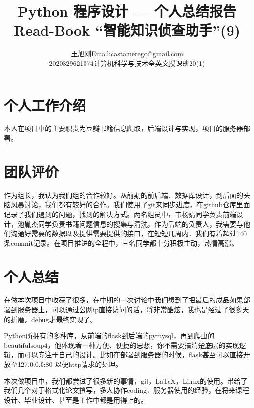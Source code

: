 \documentclass[twoside,11pt]{article}
\makeatletter
\newcommand\studentName{王旭刚}
\newcommand\studentEmail{Email:castamerego@gmail.com}
\newcommand\studentNumber{2020329621074}
\newcommand\studentClass{计算机科学与技术全英文授课班20(1)}
\makeatother
\begin{document}
\title{\Huge Python 程序设计 --- 个人总结报告 \\ \huge Read-Book ``智能知识侦查助手''(9) }

\author{\name \studentName \email \studentEmail \\
    \studentNumber \class  \studentClass
}

\maketitle

\section{个人工作介绍}
本人在项目中的主要职责为豆瓣书籍信息爬取，后端设计与实现，项目的服务器部署。

\section{团队评价}
作为组长，我认为我们组的合作较好。从前期的前后端、数据库设计，到后面的头脑风暴讨论，我们都有较好的合作。我们使用了git来同步进度，在github仓库里面记录了我们遇到的问题，找到的解决方式。两名组员中，韦杨婧同学负责前端设计，池胤杰同学负责书籍问题信息的搜集与清洗，作为后端的负责人，我需要与他们沟通好需要的数据以及提供需要提供的接口，在短短几周内，我们有着超过140条commit记录。在项目推进的全程中，三名同学都十分积极主动，热情高涨。

\section{个人总结}
在做本次项目中收获了很多，在中期的一次讨论中我们想到了把最后的成品如果部署到服务器上，可以通过公网ip直接访问的话，将非常酷炫，我也是经过了很多天的折磨，debug才最终实现了。

Python所拥有的多种库，从前端的flask到后端的pymysql，再到爬虫的beautifulsoup4，他体现着一种方便、便捷的思想，你不需要搞清楚底层的实现逻辑，而可以专注于自己的设计。比如在部署到服务器的时候，flask甚至可以直接开放至127.0.0.0:80 以便http请求的处理。


本次做项目中，我们都尝试了很多新的事情，git，\LaTeX，Linux的使用。带给了我们几个对于格式化论文撰写，多人协作coding，服务器使用的经验，在将来课程设计、毕业设计、甚至是工作中都是用得上的。
\end{document}

